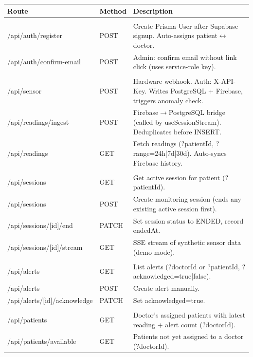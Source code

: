 \documentclass[12pt,a4paper]{report}
\begin{document}
\begin{table}[H]\centering\renewcommand{\arraystretch}{1.35}
\begin{tabularx}{\linewidth}{>{\ttfamily\small}l >{\small}l X}
\toprule
\textbf{Route} & \textbf{Method} & \textbf{Description} \\
\midrule
\multicolumn{3}{l}{\textbf{Authentication}} \\
/api/auth/register & POST & Create Prisma User after Supabase signup. Auto-assigns patient$\leftrightarrow$doctor. \\
/api/auth/confirm-email & POST & Admin: confirm email without link click (uses service-role key). \\
\midrule
\multicolumn{3}{l}{\textbf{Sensor \& Readings}} \\
/api/sensor & POST & Hardware webhook. Auth: X-API-Key. Writes PostgreSQL + Firebase, triggers anomaly check. \\
/api/readings/ingest & POST & Firebase$\to$PostgreSQL bridge (called by useSessionStream). Deduplicates before INSERT. \\
/api/readings & GET & Fetch readings (?patientId, ?range=24h|7d|30d). Auto-syncs Firebase history. \\
\midrule
\multicolumn{3}{l}{\textbf{Sessions}} \\
/api/sessions & GET & Get active session for patient (?patientId). \\
/api/sessions & POST & Create monitoring session (ends any existing active session first). \\
/api/sessions/[id]/end & PATCH & Set session status to ENDED, record endedAt. \\
/api/sessions/[id]/stream & GET & SSE stream of synthetic sensor data (demo mode). \\
\midrule
\multicolumn{3}{l}{\textbf{Alerts}} \\
/api/alerts & GET & List alerts (?doctorId or ?patientId, ?acknowledged=true|false). \\
/api/alerts & POST & Create alert manually. \\
/api/alerts/[id]/acknowledge & PATCH & Set acknowledged=true. \\
\midrule
\multicolumn{3}{l}{\textbf{Patients}} \\
/api/patients & GET & Doctor's assigned patients with latest reading + alert count (?doctorId). \\
/api/patients/available & GET & Patients not yet assigned to a doctor (?doctorId). \\

\end{tabularx}
\end{table}
\end{document}

